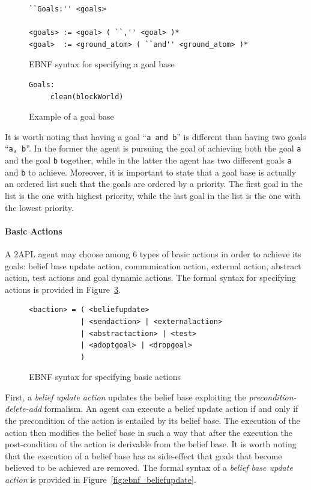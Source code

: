 \documentclass[a4paper]{article}
\begin{document}
\begin{figure}[htp]
\begin{verbatim}
``Goals:'' <goals>

<goals> := <goal> ( ``,'' <goal> )*
<goal>  := <ground_atom> ( ``and'' <ground_atom> )*
\end{verbatim}
\caption{EBNF syntax for specifying a goal base}
\label{fig:ebnf_goalbase}
\end{figure}

\begin{figure}[htp]
\begin{verbatim}
Goals:
     clean(blockWorld)
\end{verbatim}
\caption{Example of a goal base}
\label{fig:example_goalbase}
\end{figure}

It is worth noting that having a goal ``\texttt{a and b}'' is different than having two goals ``\texttt{a, b}''. In the former the agent is pursuing the goal of achieving both the goal \texttt{a} and the goal \texttt{b} together, while in the latter the agent has two different goals \texttt{a} and \texttt{b} to achieve. Moreover, it is important to state that a goal base is actually an ordered list such that the goals are ordered by a priority. The first goal in the list is the one with highest priority, while the last goal in the list is the one with the lowest priority.

\paragraph{Basic Actions}

A 2APL agent may choose among 6 types of basic actions in order to achieve its goals: belief base update action, communication action, external action, abstract action, test actions and goal dynamic actions. The formal syntax for specifying actions is provided in Figure~\ref{fig:ebnf_actions}.

\begin{figure}[htp]
\begin{verbatim}
<baction> = ( <beliefupdate>
            | <sendaction> | <externalaction> 
            | <abstractaction> | <test>
            | <adoptgoal> | <dropgoal>
            )
\end{verbatim}
\caption{EBNF syntax for specifying basic actions}
\label{fig:ebnf_actions}
\end{figure}

First, a \emph{belief update action} updates the belief base exploiting the \emph{precondition-delete-add} formalism. An agent can
execute a belief update action if and only if the precondition of the action is entailed by its belief base. The execution of the action then modifies the belief base in such a way that after the execution the post-condition of the action is derivable from the belief base. It is worth noting that the execution of a belief base has as side-effect that goals that become believed to be achieved are removed. The formal syntax of a \emph{belief base update action} is provided in Figure~\ref{fig:ebnf_beliefupdate}.
\end{document}

